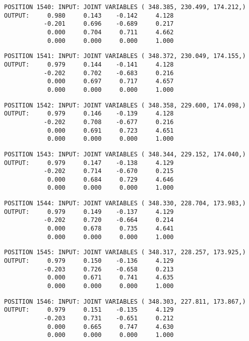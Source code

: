 \begin{verbatim}
POSITION 1540: INPUT: JOINT VARIABLES ( 348.385, 230.499, 174.212,)
OUTPUT:     0.980     0.143    -0.142     4.128
           -0.201     0.696    -0.689     0.217
            0.000     0.704     0.711     4.662
            0.000     0.000     0.000     1.000
\end{verbatim} \pagebreak[1]\begin{verbatim}
POSITION 1541: INPUT: JOINT VARIABLES ( 348.372, 230.049, 174.155,)
OUTPUT:     0.979     0.144    -0.141     4.128
           -0.202     0.702    -0.683     0.216
            0.000     0.697     0.717     4.657
            0.000     0.000     0.000     1.000
\end{verbatim} \pagebreak[1]\begin{verbatim}
POSITION 1542: INPUT: JOINT VARIABLES ( 348.358, 229.600, 174.098,)
OUTPUT:     0.979     0.146    -0.139     4.128
           -0.202     0.708    -0.677     0.216
            0.000     0.691     0.723     4.651
            0.000     0.000     0.000     1.000
\end{verbatim} \pagebreak[1]\begin{verbatim}
POSITION 1543: INPUT: JOINT VARIABLES ( 348.344, 229.152, 174.040,)
OUTPUT:     0.979     0.147    -0.138     4.129
           -0.202     0.714    -0.670     0.215
            0.000     0.684     0.729     4.646
            0.000     0.000     0.000     1.000
\end{verbatim} \pagebreak[1]\begin{verbatim}
POSITION 1544: INPUT: JOINT VARIABLES ( 348.330, 228.704, 173.983,)
OUTPUT:     0.979     0.149    -0.137     4.129
           -0.202     0.720    -0.664     0.214
            0.000     0.678     0.735     4.641
            0.000     0.000     0.000     1.000
\end{verbatim} \pagebreak[1]\begin{verbatim}
POSITION 1545: INPUT: JOINT VARIABLES ( 348.317, 228.257, 173.925,)
OUTPUT:     0.979     0.150    -0.136     4.129
           -0.203     0.726    -0.658     0.213
            0.000     0.671     0.741     4.635
            0.000     0.000     0.000     1.000
\end{verbatim} \pagebreak[1]\begin{verbatim}
POSITION 1546: INPUT: JOINT VARIABLES ( 348.303, 227.811, 173.867,)
OUTPUT:     0.979     0.151    -0.135     4.129
           -0.203     0.731    -0.651     0.212
            0.000     0.665     0.747     4.630
            0.000     0.000     0.000     1.000
\end{verbatim} \pagebreak[1]\begin{verbatim}

\end{verbatim}
